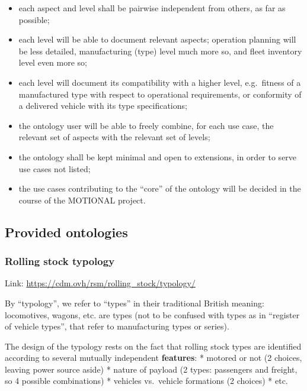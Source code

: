 \documentclass[
  11pt,
]{article}
\providecommand{\tightlist}{%
  \setlength{\itemsep}{0pt}\setlength{\parskip}{0pt}}
\begin{document}
\begin{itemize}
\tightlist
\item
  each aspect and level shall be pairwise independent from others, as
  far as possible;
\item
  each level will be able to document relevant aspects; operation
  planning will be less detailed, manufacturing (type) level much more
  so, and fleet inventory level even more so;
\item
  each level will document its compatibility with a higher level,
  e.g.~fitness of a manufactured type with respect to operational
  requirements, or conformity of a delivered vehicle with its type
  specifications;
\item
  the ontology user will be able to freely combine, for each use case,
  the relevant set of aspects with the relevant set of levels;
\item
  the ontology shall be kept minimal and open to extensions, in order to
  serve use cases not listed;
\item
  the use cases contributing to the ``core'' of the ontology will be
  decided in the course of the MOTIONAL project.
\end{itemize}

\hypertarget{provided-ontologies}{%
\subsection{Provided ontologies}\label{provided-ontologies}}

\hypertarget{rolling-stock-typology}{%
\subsubsection{Rolling stock typology}\label{rolling-stock-typology}}

Link: \url{https://cdm.ovh/rsm/rolling_stock/typology/}

By ``typology'', we refer to ``types'' in their traditional British
meaning: locomotives, wagons, etc. are types (not to be confused with
types as in ``register of vehicle types'', that refer to manufacturing
types or series).

The design of the typology rests on the fact that rolling stock types
are identified according to several mutually independent
\textbf{features}: * motored or not (2 choices, leaving power source
aside) * nature of payload (2 types: passengers and freight, so 4
possible combinations) * vehicles vs.~vehicle formations (2 choices) *
etc.
\end{document}
